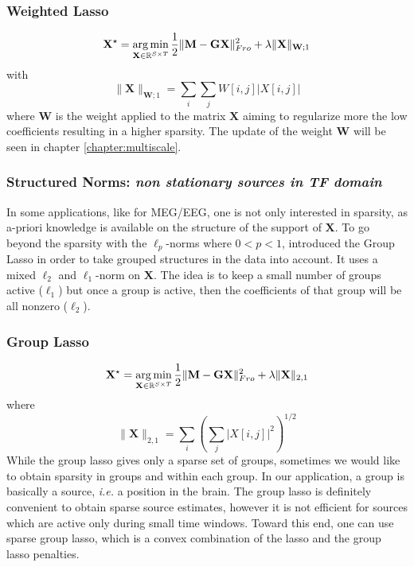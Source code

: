 \subsubsection*{Weighted Lasso}
\begin{equation} \label{eq_wlasso}
	\mathbf{X}^\star = \mathop{\mathrm{arg}\,\mathrm{min}}_{\mathbf{X}\in\mathbb{R}^{S\times T}}\frac{1}{2}\|\mathbf{M}-\mathbf{GX}\|_{Fro}^2 + \lambda\|\mathbf{X}\|_{\mathbf{W};1}
\end{equation}
with
\begin{equation*}
	\|\mathbf{X}\|_{\mathbf{W};1}=\sum_i\sum_j W[i,j]|X[i,j]|
\end{equation*}
where $\mathbf{W}$ is the weight applied to the matrix $\mathbf{X}$ aiming to regularize more the low coefficients resulting in a higher sparsity. The update of the weight $\mathbf{W}$ will be seen in chapter \ref{chapter:multiscale}.
\endadjustwidth

\subsubsection*{Structured Norms: \textit{non stationary sources in TF domain}}
In some applications, like for MEG/EEG, one is not only interested in sparsity, as a-priori knowledge is available on the structure of the support of $\mathbf{X}$. To go beyond the sparsity with the $\ell_p$-norms where $0<p<1$, \cite{yuan2006model} introduced the Group Lasso in order to take grouped structures  in the data into account. It uses a mixed $\ell_2$ and $\ell_1$-norm on $\mathbf{X}$. The idea is to keep a small number of groups active ($\ell_1$) but once a group is active, then the coefficients of that group will be all nonzero ($\ell_2$).
\adjustwidth{1em}{0pt}
\vspace{-10pt}
\subsubsection*{Group Lasso}
\vspace{-10pt}
\begin{equation} \label{eq_glasso}
	\mathbf{X}^\star = \mathop{\mathrm{arg}\,\mathrm{min}}_{\mathbf{X}\in\mathbb{R}^{S\times T}}\frac{1}{2}\|\mathbf{M}-\mathbf{GX}\|_{Fro}^2 + \lambda\|\mathbf{X}\|_{2,1}
\end{equation}
where
\begin{equation*}	\|\mathbf{X}\|_{2,1}=\sum_i\left(\sum_j|X[i,j]|^2\right)^{1/2}
\end{equation*}
\endadjustwidth
While the group lasso gives only a sparse set of groups, sometimes we would like to obtain sparsity in groups and within each group. In our application, a group is basically a source, \textit{i.e.} a position in the brain. The group lasso is definitely convenient to obtain sparse source estimates, however it is not efficient for sources which are active only during small time windows. Toward this end, one can use sparse group lasso, which is a convex combination of the lasso and the group lasso penalties.
\adjustwidth{1em}{0pt}

